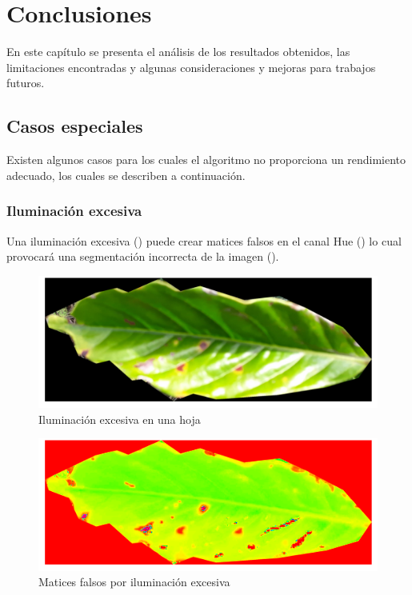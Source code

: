 \chapter{Conclusiones}
En este capítulo se presenta el análisis de los resultados obtenidos, las limitaciones encontradas y algunas consideraciones y mejoras para trabajos futuros.

\section{Casos especiales}
Existen algunos casos para los cuales el algoritmo no proporciona un rendimiento adecuado, los cuales se describen a continuación.

\subsection{Iluminación excesiva}
Una iluminación excesiva () puede crear matices falsos en el canal Hue () lo cual provocará una segmentación incorrecta de la imagen ().

\begin{figure}[H]
\centering
\includegraphics[scale=1]{images/special_case_light_1_rgb.png}
\caption{Iluminación excesiva en una hoja}
\label{img:light_1_rgb}
\end{figure}

\begin{figure}[H]
\centering
\includegraphics[scale=1]{images/special_case_light_1_hue.png}
\caption{Matices falsos por iluminación excesiva}
\label{img:light_1_hue}
\end{figure}

